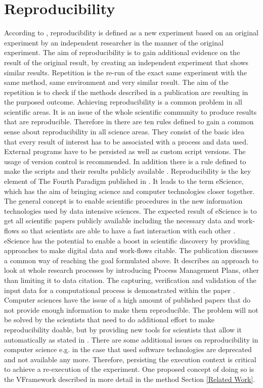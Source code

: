 \documentclass[draft,final]{vutinfth} %
\begin{document}
\section{Reproducibility}\label{Reproducibility}
According to \cite{6064509}, reproducibility is defined as a new experiment based on an original experiment by an independent researcher in the manner of the original experiment. The aim of reproducibility is to gain additional evidence on the result of the original result, by creating an independent experiment that shows similar results. Repetition is the re-run of the exact same experiment with the same method, same environment and very similar result. The aim of the repetition is to check if the methods described in a publication are resulting in the purposed outcome. 
Achieving reproducibility is a common problem in all scientific areas. It is an issue of the whole scientific community to produce results that are reproducible. Therefore in \cite{10.1371/journal.pcbi.1003285} there are ten rules defined to gain a common sense about reproducibility in all science areas. They consist of the basic idea that every result of interest has to be associated with a process and data used. External programs have to be persisted as well as custom script versions. The usage of version control is recommended. In addition there is a rule defined to make the scripts and their results publicly available \cite{10.1371/journal.pcbi.1003285}. 
Reproducibility is the key element of The Fourth Paradigm published in \cite{noauthororeditorfourth}. It leads to the term eScience, which has the aim of bringing science and computer technologies closer together. The general concept is to enable scientific procedures in the new information technologies used by data intensive sciences. The expected result of eScience is to get all scientific papers publicly available including the necessary data and work-flows so that scientists are able to have a fast interaction with each other \cite{noauthororeditorfourth}. 
eScience has the potential to enable a boost in scientific discovery by providing approaches to make digital data and work-flows citable. The publication \cite{Rauber2015RepeatabilityAR} discusses a common way of reaching the goal formulated above. It describes an approach to look at whole research processes by introducing Process Management Plans, other than limiting it to data citation. The capturing, verification and validation of the input data for a computational process is demonstrated within the paper \cite{Rauber2015RepeatabilityAR}.
Computer sciences have the issue of a high amount of published papers that do not provide enough information to make them reproducible. The problem will not be solved by the scientists that need to do additional effort to make reproducibility doable, but by providing new tools for scientists that allow it automatically as stated in \cite{MIKSA201725}. There are some additional issues on reproducibility in computer science e.g. in the case that used software technologies are deprecated and not available any more. Therefore, persisting the execution context is critical to achieve a re-execution of the experiment. One proposed concept of doing so is the VFramework described in more detail in the method Section \ref{Related Work}. 
\end{document}

